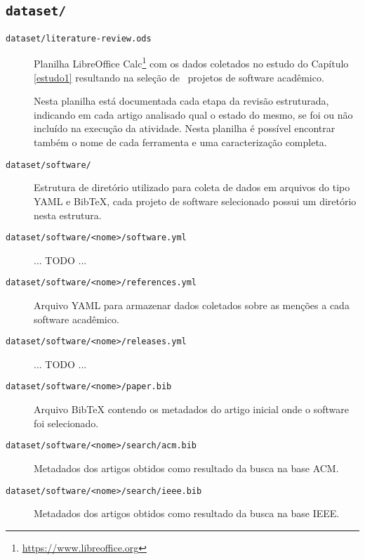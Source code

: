 \subsection{\texttt{dataset/}}


\begin{description}

  \item [\texttt{dataset/literature-review.ods}]
    Planilha LibreOffice Calc\footnote{\url{https://www.libreoffice.org}} com
    os dados coletados no estudo do Capítulo \ref{estudo1} resultando na
    seleção de \SoftwareCount \ projetos de software acadêmico.

Nesta planilha está documentada cada etapa da revisão estruturada, indicando em
cada artigo analisado qual o estado do mesmo, se foi ou não incluído na
execução da atividade.  Nesta planilha é possível encontrar também o nome de
cada ferramenta e uma caracterização completa.

  \item [\texttt{dataset/software/}]
    Estrutura de diretório utilizado para coleta de dados em arquivos do tipo
    YAML e BibTeX, cada projeto de software selecionado possui um diretório
    nesta estrutura.

  \item [\texttt{dataset/software/<nome>/software.yml}]
    ... TODO ...

  \item [\texttt{dataset/software/<nome>/references.yml}]
    Arquivo YAML para armazenar dados coletados sobre as menções a cada software
    acadêmico.

  \item [\texttt{dataset/software/<nome>/releases.yml}]
    ... TODO ...

  \item [\texttt{dataset/software/<nome>/paper.bib}]
    Arquivo BibTeX contendo os metadados do artigo inicial onde o software foi
    selecionado.

  \item [\texttt{dataset/software/<nome>/search/acm.bib}]
    Metadados dos artigos obtidos como resultado da busca na base ACM.

  \item [\texttt{dataset/software/<nome>/search/ieee.bib}]
    Metadados dos artigos obtidos como resultado da busca na base IEEE.

\end{description}

